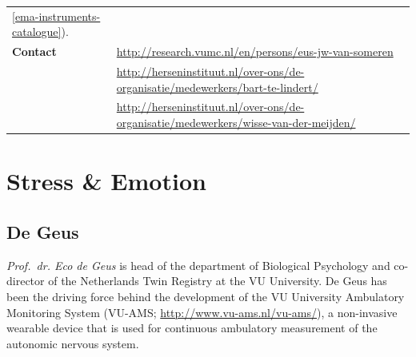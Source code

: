 \documentclass[]{book}
\begin{document}
\begin{longtable}[]{@{}ll@{}}
\begin{minipage}[t]{0.69\columnwidth}
\ref{ema-instruments-catalogue}).\strut
\end{minipage}\tabularnewline
\begin{minipage}[t]{0.25\columnwidth}\raggedright\strut
\textbf{Contact}\strut
\end{minipage} & \begin{minipage}[t]{0.69\columnwidth}\raggedright\strut
\url{http://research.vumc.nl/en/persons/eus-jw-van-someren}\strut
\end{minipage}\tabularnewline
\begin{minipage}[t]{0.25\columnwidth}\raggedright\strut
\strut
\end{minipage} & \begin{minipage}[t]{0.69\columnwidth}\raggedright\strut
\url{http://herseninstituut.nl/over-ons/de-organisatie/medewerkers/bart-te-lindert/}\strut
\end{minipage}\tabularnewline
\begin{minipage}[t]{0.25\columnwidth}\raggedright\strut
\strut
\end{minipage} & \begin{minipage}[t]{0.69\columnwidth}\raggedright\strut
\url{http://herseninstituut.nl/over-ons/de-organisatie/medewerkers/wisse-van-der-meijden/}\strut
\end{minipage}\tabularnewline
\bottomrule
\end{longtable}

\section{Stress \& Emotion}\label{stress-emotion}

\subsection{De Geus}\label{de-geus}

 

\emph{Prof.~dr. Eco de Geus} is head of the department of Biological
Psychology and co-director of the Netherlands Twin Registry at the VU
University. De Geus has been the driving force behind the development of
the VU University Ambulatory Monitoring System (VU-AMS;
\url{http://www.vu-ams.nl/vu-ams/}), a non-invasive wearable device that
is used for continuous ambulatory measurement of the autonomic nervous
system.
\end{document}
